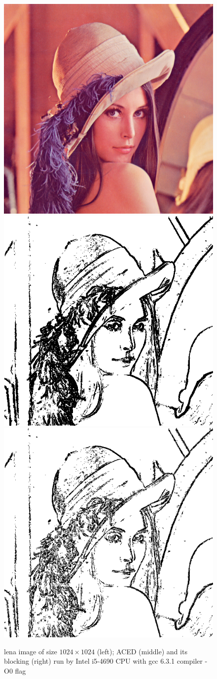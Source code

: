 \documentclass[letterpaper]{article}
\begin{document}
\begin{figure}\centering
		\includegraphics[width=0.3\columnwidth]{lena_std.png}
		\includegraphics[width=0.3\columnwidth]{lena_std_test3.png}
		\includegraphics[width=0.3\columnwidth]{lena_std_testb1.png}
	\caption{lena image of size $1024\times1024$ (left); ACED (middle) and its blocking (right) run by Intel i5-4690 CPU with gcc 6.3.1 compiler -O0 flag}\label{fig:lena_ACED}
\end{figure} 
\end{document}
